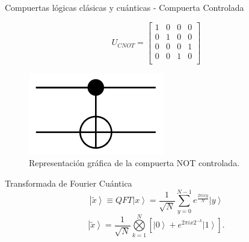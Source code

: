 \begin{frame}{Compuertas lógicas clásicas y cuánticas - Compuerta Controlada}
\begin{minipage}{0.49\linewidth}
\begin{equation*}
    U_{CNOT}=\left[\begin{matrix}
    1 & 0 & 0 & 0\\
    0 & 1 & 0 & 0\\
    0 & 0 & 0 & 1\\
    0 & 0 & 1 & 0\\
    \end{matrix}\right]
\end{equation*}
\end{minipage}
\begin{minipage}{0.49\linewidth}
\begin{figure}[H]
        \centering
        \includegraphics[scale=0.7]{images/not_gate.png}
        \caption{Representación gráfica de la compuerta NOT controlada.}
    \end{figure}
\end{minipage}
\end{frame}
\begin{frame}{Transformada de Fourier Cuántica}
 \begin{equation*}
    \left|\tilde{x} \right\rangle \equiv QFT\left| x \right\rangle= \frac{1}{\sqrt{N}} \sum\limits_{y=0}^{N-1} e^{\frac{2\pi i x y}{N}} \left|y \right\rangle
\end{equation*} 
\begin{equation*}
    \left|\tilde{x} \right\rangle =\frac{1}{\sqrt{N}} \bigotimes\limits_{k=1}^N \left[\left|0 \right\rangle+e^{2\pi i x 2^{-k}} \left| 1\right\rangle  \right].
\end{equation*}
\end{frame}

